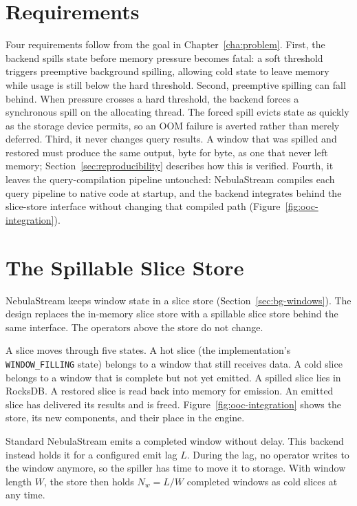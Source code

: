\section{Requirements\label{sec:requirements}}

Four requirements follow from the goal in Chapter~\ref{cha:problem}.
First, the backend spills state before memory pressure becomes fatal: a soft threshold triggers preemptive background spilling, allowing cold state to leave memory while usage is still below the hard threshold.
Second, preemptive spilling can fall behind.
When pressure crosses a hard threshold, the backend forces a synchronous spill on the allocating thread.
The forced spill evicts state as quickly as the storage device permits, so an \ac{OOM} failure is averted rather than merely deferred.
Third, it never changes query results.
A window that was spilled and restored must produce the same output, byte for byte, as one that never left memory; Section~\ref{sec:reproducibility} describes how this is verified.
Fourth, it leaves the query-compilation pipeline untouched: NebulaStream compiles each query pipeline to native code at startup, and the backend integrates behind the slice-store interface without changing that compiled path (Figure~\ref{fig:ooc-integration}).

\section{The Spillable Slice Store\label{sec:architecture}}

NebulaStream keeps window state in a slice store (Section~\ref{sec:bg-windows}).
The design replaces the in-memory slice store with a spillable slice store behind the same interface.
The operators above the store do not change.

A slice moves through five states.
A hot slice (the implementation's \texttt{WINDOW\_FILLING} state) belongs to a window that still receives data.
A cold slice belongs to a window that is complete but not yet emitted.
A spilled slice lies in RocksDB.
A restored slice is read back into memory for emission.
An emitted slice has delivered its results and is freed.
Figure~\ref{fig:ooc-integration} shows the store, its new components, and their place in the engine.



Standard NebulaStream emits a completed window without delay.
This backend instead holds it for a configured emit lag $L$.
During the lag, no operator writes to the window anymore, so the spiller has time to move it to storage.
With window length $W$, the store then holds $N_w = L/W$ completed windows as cold slices at any time.


